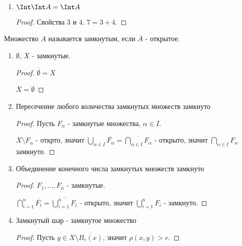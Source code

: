 \begin{theorem}
\begin{enumerate}
\begin{proof}
                \TODO
            \end{proof}
        \item $\Int \Int A = \Int A$
            \begin{proof} \thmslashn
            
                Свойства $3$ и $4$. $7 = 3 + 4$.
            \end{proof}
    \end{enumerate}
    \begin{definition} \thmslashn 
    
        Множество $A$ называется замкнутым, если $\overline{A}$ - открытое.
    \end{definition}
    \begin{theorem} \thmslashn
    
        \begin{enumerate}
            \item $ \emptyset$, $X$ - замкнутые.
                \begin{proof}
                    $\overline{ \emptyset} = X$ 

                    $\overline{X} = \emptyset$
                \end{proof}
            \item Пересечение любого количества замкнутых множеств замкнуто
                \begin{proof}
                    Пусть $F_{\alpha}$ - замкнутые множества, $\alpha\in I$.
                    
                    $X \setminus F_{\alpha}$ - открто, значит $\bigcup_{\alpha \in  I} \overline{F_{\alpha}} = \overline{\bigcap_{\alpha \in  I} F_{\alpha}}$ - открыто, значит $\bigcap_{\alpha\in I} F_{\alpha}$ замкнуто.
                \end{proof}
            \item Объединение конечного числа замкнутых множеств замкнуто
                \begin{proof}
                    $F_1, \ldots, F_{n}$ - замкнутые.

                    $\bigcap_{i=1}^{n} \overline{F_i} = \overline{\bigcup_{i=1}^{n} F_{i}}$ - открыто, значит $\bigcup_{i=1}^{n} F_{i} $ - замкнуто.
                \end{proof}
            \item Замкнутый шар - замкнутое множество
                \begin{proof}
                    Пусть $y\in X \setminus \overline{B_{r}(x)}$, значит $\rho(x, y) > r$.


\end{proof}
\end{enumerate}
\end{theorem}
\end{theorem}
